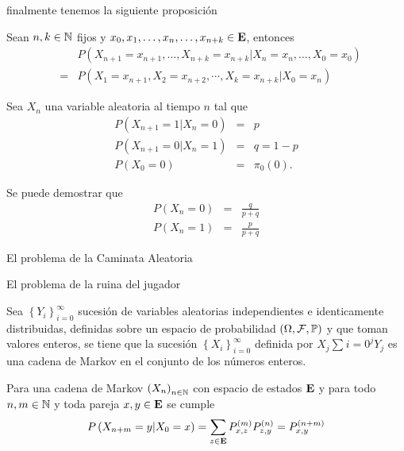 finalmente tenemos la siguiente proposición

\begin{Prop}
Sean $n,k\in\mathbb{N}$ fijos y $x_{0},x_{1},\ldots,x_{n},\ldots,x_{n+k}\in\mathbf{E}$, entonces
\begin{eqnarray*}
&&P\left(X_{n+1}=x_{n+1},\ldots,X_{n+k}=x_{n+k}|X_{n}=x_{n},\ldots,X_{0}=x_{0}\right)\\
&=&P\left(X_{1}=x_{n+1},X_{2}=x_{n+2},\cdots,X_{k}=x_{n+k}|X_{0}=x_{n}\right)
\end{eqnarray*}
\end{Prop}


\begin{Ejem}
Sea $X_{n}$ una variable aleatoria al tiempo $n$ tal que
\begin{eqnarray}
P\left(X_{n+1}=1|X_{n}=0\right)&=&p\\
P\left(X_{n+1}=0|X_{n}=1\right)&=&q=1-p\\
P\left(X_{0}=0\right)&=&\pi_{0}\left(0\right).
\end{eqnarray}
\end{Ejem}
Se puede demostrar que
\begin{eqnarray}
P\left(X_{n}=0\right)&=&\frac{q}{p+q}\\
P\left(X_{n}=1\right)&=&\frac{p}{p+q}
\end{eqnarray}

\begin{Ejem}
El problema de la Caminata Aleatoria
\end{Ejem}

\begin{Ejem}
El problema de la ruina del jugador
\end{Ejem}

\begin{Ejem}
Sea $\left\{Y_{i}\right\}_{i=0}^{\infty}$ sucesión de variables aleatorias independientes e identicamente distribuidas, definidas sobre un espacio de probabilidad $\left(\Omega,\mathcal{F},\mathbb{P}\right)$ y que toman valores enteros, se tiene que la sucesión $\left\{X_{i}\right\}_{i=0}^{\infty}$ definida por $X_{j}\sum_{}i=0^{j}Y_{j}$ es una cadena de Markov en el conjunto de los números enteros.
\end{Ejem}

\begin{Prop}
Para una cadena de Markov $\left(X_{n}\right)_{n\in\mathbb{N}}$ con espacio de estados $\mathbf{E}$ y para todo $n,m\in \mathbb{N}$ y toda pareja $x,y\in\mathbf{E}$ se cumple
\begin{equation}
P\left(X_{n+m}=y|X_{0}=x\right)=\sum_{z\in\mathbf{E}}P_{x,z}^{(m)}P_{z,y}^{(n)}=P_{x,y}^{(n+m)}
\end{equation}
\end{Prop}

